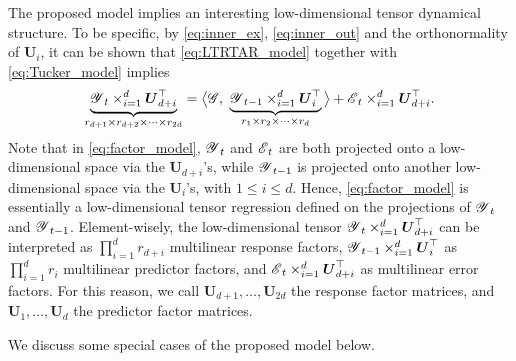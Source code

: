 \documentclass[12pt]{article}
\newcommand{\bm}{\boldsymbol}
\newcommand{\cm}[1]{\mbox{\boldmath$\mathscr{#1}$}}
\begin{document}
The proposed model  implies an interesting low-dimensional tensor dynamical structure. To be specific, by \eqref{eq:inner_ex}, \eqref{eq:inner_out} and the orthonormality of $\bm{U}_i$, it can be shown that  \eqref{eq:LTRTAR_model} together with \eqref{eq:Tucker_model} implies
\begin{equation}\label{eq:factor_model}
\underbrace{ \cm{Y}_t\times_{i=1}^d\bm{U}_{d+i}^\top }_{r_{d+1}\times r_{d+2}\times \cdots \times r_{2d}} =\big \langle\cm{G},~\underbrace{ \cm{Y}_{t-1} \times_{i=1}^d\bm{U}_i^\top }_{r_{1}\times r_{2}\times \cdots \times r_{d}}\big \rangle+\cm{E}_t\times_{i=1}^d\bm{U}_{d+i}^\top.
\end{equation}
Note that in \eqref{eq:factor_model}, $\cm{Y}_t$ and $\cm{E}_t$ are both  projected onto a low-dimensional space via the $\bm{U}_{d+i}$'s, while $\cm{Y}_{t-1}$ is projected onto another low-dimensional space via the $\bm{U}_{i}$'s, with $1\leq i\leq d$. Hence,  \eqref{eq:factor_model} is essentially a low-dimensional tensor regression defined on the  projections of $\cm{Y}_t$ and $\cm{Y}_{t-1}$. Element-wisely, the low-dimensional tensor $\cm{Y}_t\times_{i=1}^d\bm{U}_{d+i}^\top$ can be interpreted as  $\prod_{i=1}^dr_{d+i}$ multilinear response factors, $\cm{Y}_{t-1}\times_{i=1}^d\bm{U}_i^\top$ as $\prod_{i=1}^dr_i$  multilinear predictor factors, and $\cm{E}_t\times_{i=1}^d\bm{U}_{d+i}^\top$ as multilinear error factors.  For this reason, we call  $\bm{U}_{d+1}, \dots, \bm{U}_{2d}$ the response factor matrices, and  $\bm{U}_{1}, \dots, \bm{U}_{d}$ the predictor factor matrices.

We discuss some special cases of the proposed model below.
\end{document}
